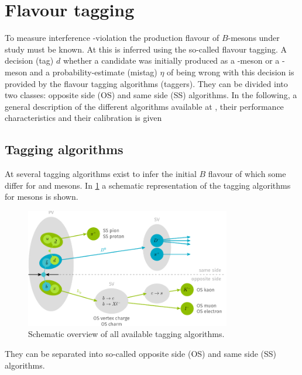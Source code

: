 \section{Flavour tagging}
\label{sec:flavourtagging}

To measure interference \CP-violation the production flavour of $B$-mesons under study must be known.
At \lhcb this is inferred using the so-called flavour tagging.
A decision (tag) $d$ whether a \B candidate was initially produced as a \Bz-meson or a \Bzb-meson and a probability-estimate (mistag) $\eta$ of being wrong with this decision is provided by the flavour tagging algorithms (taggers).
They can be divided into two classes: opposite side (OS) and same side (SS) algorithms.
In the following, a general description of the different algorithms available at \lhcb, their performance characteristics and their calibration is given

\subsection{Tagging algorithms}
\label{sec:taggingalgorithms}

At \lhcb several tagging algorithms exist to infer the initial $B$ flavour of which some differ for \Bz and \Bs mesons.
In \cref{fig:taggingalgorithms} a schematic representation of the tagging algorithms for \Bz mesons is shown.
\begin{figure}[tbp]
    \centering
    \includegraphics[width=0.8\textwidth]{09FlavourTagging/figs/FTscheme.pdf}
    \caption{Schematic overview of all available \Bz tagging algorithms.}
    \label{fig:taggingalgorithms}
\end{figure}
They can be separated into so-called opposite side (OS) and same side (SS) algorithms.

